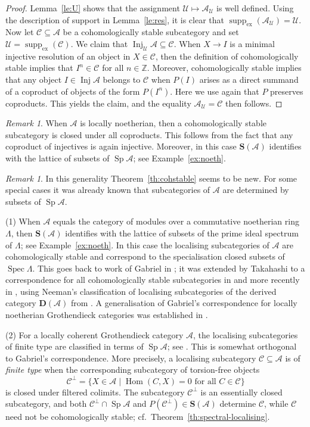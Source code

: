 \documentclass[a4paper]{amsart}
\theoremstyle{plain}
\theoremstyle{definition}
\theoremstyle{remark}
\newtheorem{rem}[thm]{Remark}
\numberwithin{equation}{section}
\newcommand{\Hom}{\operatorname{Hom}}
\newcommand{\Inj}{\operatorname{Inj}}
\newcommand{\Sp}{\operatorname{Sp}}
\newcommand{\Spec}{\operatorname{Spec}}
\newcommand{\suppex}{\operatorname{supp}_{\mathrm{ex}}}
\def\A{\mathcal A}
\def\C{\mathcal C}
\def\U{\mathcal U}
\def\bfD{\mathbf D}
\def\bfS{\mathbf S}
\def\bbZ{\mathbb Z}
\def\La{\Lambda}
\begin{document}
\begin{proof}
  Lemma~\ref{le:U} shows that the assignment $\U\mapsto \A_\U$ is well
  defined. Using the description of support in Lemma~\ref{le:res}, it
  is clear that $\suppex(\A_\U)=\U$. Now let $\C\subseteq\A$ be a
  cohomologically stable subcategory and set $\U=\suppex(\C)$. We claim that
  $\Inj_\U\A\subseteq\C$. When $X\to I$ is a minimal
  injective resolution of an object in $X\in\C$, then the definition
  of cohomologically stable implies that $I^n\in\C$ for all
  $n\in\bbZ$. Moreover, cohomologically stable implies that any object
  $I\in\Inj\A$ belongs to $\C$ when $P(I)$ arises as a direct summand
  of a coproduct of objects of the form $P(I^n)$. Here we use again
  that $P$ preserves coproducts. This yields the claim, and the
  equality $\A_\U=\C$ then follows.
\end{proof}

\begin{rem}
  When $\A$ is locally noetherian, then a cohomologically stable
  subcategory is closed under all coproducts. This follows from the
  fact that any coproduct of injectives is again injective. Moreover,
  in this case $\bfS(\A)$ identifies with the lattice of subsets of
  $\Sp\A$; see Example~\ref{ex:noeth}.
\end{rem}

\begin{rem}\label{re:cohstable}
  In this generality Theorem~\ref{th:cohstable} seems to be new. For
  some special cases it was already known that subcategories of $\A$
  are determined by subsets of $\Sp\A$.

  (1) When $\A$ equals the category of modules over a commutative
  noetherian ring $\La$, then $\bfS(\A)$ identifies with the lattice
  of subsets of the prime ideal spectrum of $\La$; see
  Example~\ref{ex:noeth}. In this case the localising subcategories of
  $\A$ are cohomologically stable and correspond to the specialisation
  closed subsets of $\Spec\La$.  This goes back to work of Gabriel in
  \cite{Ga1962}; it was extended by Takahashi to a correspondence for
  all cohomologically stable subcategories in \cite{Ta2009} and more
  recently in \cite{MT2022}, using Neeman's classification of
  localising subcategories of the derived category $\bfD(\A)$ from
  \cite{Ne1992}. A generalisation of Gabriel's correspondence for
  locally noetherian Grothendieck categories was established in
  \cite{WM2024}.

(2) For a locally coherent Grothendieck category $\A$, the localising
subcategories of finite type are classified in terms of $\Sp\A$; see
\cite{He1997,Kr1997}. This is somewhat orthogonal to Gabriel's
correspondence.  More precisely, a localising subcategory
$\C\subseteq\A$ is of \emph{finite type} when the corresponding
subcategory of torsion-free objects
\[\C^\perp=\{X\in\A\mid \Hom(C,X)=0\text{ for all
  }C\in\C\}\] is closed under filtered colimits. The subcategory
$\C^\perp$ is an essentially closed subcategory, and both $\C^\perp\cap\Sp\A$ and
$P(\C^\perp)\in\bfS(\A)$ determine $\C$, while $\C$ need not be
cohomologically stable; cf.\ Theorem~\ref{th:spectral-localising}.
\end{rem}
\end{document}

